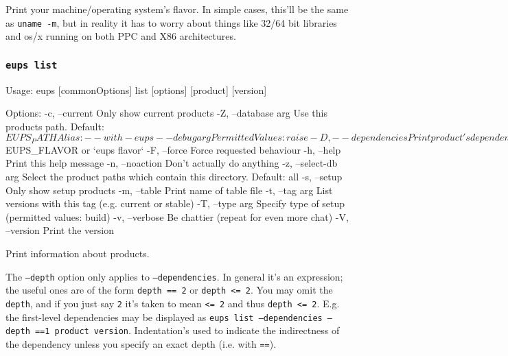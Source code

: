 \documentclass{article}
\newcommand{\code}[1]{\texttt{#1}}
\let\overbatim=\verbatim
\let\oendverbatim=\endverbatim
\renewenvironment{verbatim}
{\center\minipage{16cm}\overbatim}
{\oendverbatim\endminipage\endcenter}
\begin{document}
Print your machine/operating system's flavor.  In simple cases, this'll
be the same as \code{uname -m}, but in reality it has to worry about things
like 32/64 bit libraries and os/x running on both PPC and X86 architectures.


\subsubsection{\code{eups list}}
\begin{verbatim}
Usage:
    eups [commonOptions] list [options] [product] [version]

Options:
   -c, --current           Only show current products
   -Z, --database   arg    Use this products path. Default: $EUPS_PATH
                           Alias: --with-eups
       --debug      arg    Permitted Values: raise
   -D, --dependencies      Print product's dependencies
       --depth      arg    Only list this many layers of dependency
   -d, --directory         Print product directory
   -e, --exact             Use the as-installed version, not the conditional in the table file
   -f, --flavor     arg    Use this flavor. Default: $EUPS_FLAVOR or `eups flavor`
   -F, --force             Force requested behaviour
   -h, --help              Print this help message
   -n, --noaction          Don't actually do anything
   -z, --select-db  arg    Select the product paths which contain this directory.
                           Default: all
   -s, --setup             Only show setup products
   -m, --table             Print name of table file
   -t, --tag        arg    List versions with this tag (e.g. current or stable)
   -T, --type       arg    Specify type of setup (permitted values: build)
   -v, --verbose           Be chattier (repeat for even more chat)
   -V, --version           Print the version
\end{verbatim}

Print information about products.

The \code{--depth} option only applies to \code{--dependencies}. In general it's
an expression; the useful ones are of the form \code{depth == 2} or \code{depth <= 2}.
You may omit the \code{depth}, and if you just say \code{2} it's taken to mean \code{<= 2}
and thus \code{depth <= 2}.  E.g. the first-level dependencies may be displayed as
\code{eups list --dependencies --depth ==1 product version}.  Indentation's used to
indicate the indirectness of the dependency unless you specify an exact depth (i.e. with \code{==}).
\end{document}
